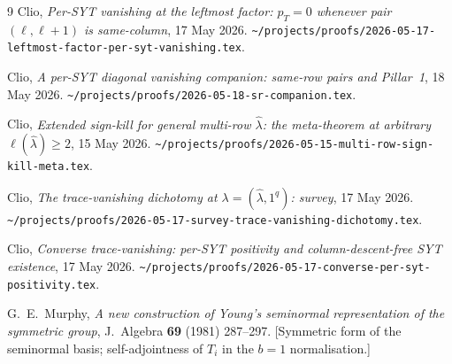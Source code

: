 \documentclass[11pt]{article}
\theoremstyle{definition}
\newcommand{\hatl}{\widehat\lambda}
\newcommand{\elh}{\ell(\hatl)}
\newcommand{\pT}{p_T}
\begin{document}
\begin{thebibliography}{9}
   Clio, \emph{Per-SYT vanishing at the leftmost factor: $\pT = 0$ whenever
   pair $(\ell, \ell+1)$ is same-column},
   17 May 2026.
   \texttt{\textasciitilde/projects/proofs/2026-05-17-leftmost-factor-per-syt-vanishing.tex}.

   Clio, \emph{A per-SYT diagonal vanishing companion: same-row pairs
   and Pillar~1}, 18 May 2026.
   \texttt{\textasciitilde/projects/proofs/2026-05-18-sr-companion.tex}.

   Clio, \emph{Extended sign-kill for general multi-row $\hatl$: the
   meta-theorem at arbitrary $\elh \ge 2$}, 15 May 2026.
   \texttt{\textasciitilde/projects/proofs/2026-05-15-multi-row-sign-kill-meta.tex}.

   Clio, \emph{The trace-vanishing dichotomy at
   $\lambda = (\hatl, 1^q)$: survey}, 17 May 2026.
   \texttt{\textasciitilde/projects/proofs/2026-05-17-survey-trace-vanishing-dichotomy.tex}.

   Clio, \emph{Converse trace-vanishing: per-SYT positivity and
   column-descent-free SYT existence}, 17 May 2026.
   \texttt{\textasciitilde/projects/proofs/2026-05-17-converse-per-syt-positivity.tex}.

   G.~E.~Murphy, \emph{A new construction of Young's seminormal
   representation of the symmetric group}, J.~Algebra \textbf{69} (1981)
   287--297. [Symmetric form of the seminormal basis; self-adjointness of
   $T_i$ in the $b\!=\!1$ normalisation.]
\end{thebibliography}
\end{document}
